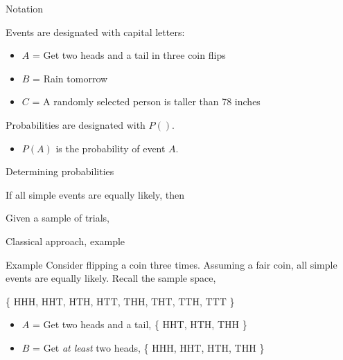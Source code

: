 \documentclass[xcolor=table, aspectratio=169, bigger, handout]{beamer}
\begin{document}
\begin{frame}{Notation}
\begin{block}{}
Events are designated with capital letters:
\pause
\begin{itemize}
\item $A$ = Get two heads and a tail in three coin flips
\item $B$ = Rain tomorrow
\item $C$ = A randomly selected person is taller than 78 inches
\end{itemize}
\end{block}

\pause
\begin{block}{}
Probabilities are designated with $P()$.
\pause
\begin{itemize}
\item $P(A)$ is the probability of event $A$.
\end{itemize}
\end{block}
\end{frame}

\begin{frame}{Determining probabilities}
\begin{block}{}
 If all simple events are equally likely, then\\
\medskip
{}
\end{block}

\pause

\begin{block}{}
 Given a sample of trials,\\
\medskip
{} 
\end{block}

\end{frame}

\begin{frame}{Classical approach, example}
\begin{exampleblock}{Example}
Consider flipping a coin three times. Assuming a fair coin, all simple events are equally likely. Recall the sample space,\\
\smallskip
{\centering
\{ HHH, HHT, HTH, HTT, THH, THT, TTH, TTT \} \par
}
\begin{itemize}
\pause
\item $A$ = Get two heads and a tail, \{ HHT, HTH, THH \}
\pause
\\

\pause
\item $B$ = Get \emph{at least} two heads,  \{ HHH,  HHT, HTH, THH \}
\pause
\\
\end{itemize}
\end{exampleblock}
\end{frame}
\end{document}
